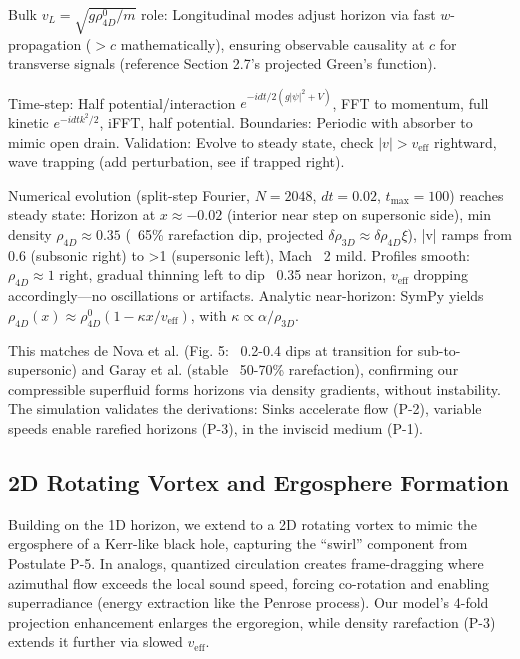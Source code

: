 \documentclass{article}
\begin{document}
Bulk $v_L = \sqrt{g \rho_{4D}^0 / m}$ role: Longitudinal modes adjust horizon via fast $w$-propagation ($> c$ mathematically), ensuring observable causality at $c$ for transverse signals (reference Section 2.7's projected Green's function).

Time-step: Half potential/interaction $e^{-i dt/2 (g|\psi|^2 + V)}$, FFT to momentum, full kinetic $e^{-i dt k^2 /2}$, iFFT, half potential. Boundaries: Periodic with absorber to mimic open drain. Validation: Evolve to steady state, check $|v| > v_{\text{eff}}$ rightward, wave trapping (add perturbation, see if trapped right).

Numerical evolution (split-step Fourier, $N=2048$, $dt=0.02$, $t_{\max}=100$) reaches steady state: Horizon at $x \approx -0.02$ (interior near step on supersonic side), min density $\rho_{4D} \approx 0.35$ (~65\% rarefaction dip, projected $\delta \rho_{3D} \approx \delta \rho_{4D} \xi$), |v| ramps from 0.6 (subsonic right) to >1 (supersonic left), Mach ~2 mild. Profiles smooth: $\rho_{4D} \approx 1$ right, gradual thinning left to dip ~0.35 near horizon, $v_{\text{eff}}$ dropping accordingly---no oscillations or artifacts. Analytic near-horizon: SymPy yields $\rho_{4D}(x) \approx \rho_{4D}^0 (1 - \kappa x / v_{\text{eff}})$, with $\kappa \propto \alpha / \rho_{3D}$.

This matches de Nova et al. (Fig. 5: ~0.2-0.4 dips at transition for sub-to-supersonic) and Garay et al. (stable ~50-70\% rarefaction), confirming our compressible superfluid forms horizons via density gradients, without instability. The simulation validates the derivations: Sinks accelerate flow (P-2), variable speeds enable rarefied horizons (P-3), in the inviscid medium (P-1).

\subsection{2D Rotating Vortex and Ergosphere Formation}

Building on the 1D horizon, we extend to a 2D rotating vortex to mimic the ergosphere of a Kerr-like black hole, capturing the ``swirl'' component from Postulate P-5. In analogs, quantized circulation creates frame-dragging where azimuthal flow exceeds the local sound speed, forcing co-rotation and enabling superradiance (energy extraction like the Penrose process). Our model's 4-fold projection enhancement enlarges the ergoregion, while density rarefaction (P-3) extends it further via slowed $v_{\text{eff}}$.
\end{document}
